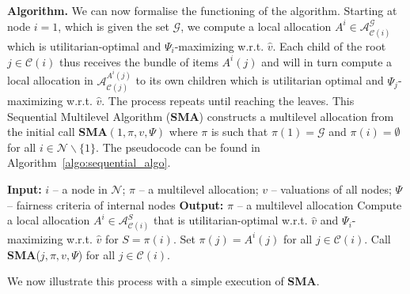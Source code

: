 \documentclass[]{article}
\newcommand{\nodes}{\mathcal{N}}
\newcommand{\items}{\mathcal{G}}
\newcommand{\children}{\mathcal{C}}
\newcommand{\allocations}{\mathcal{A}}
\begin{document}
\medskip

\noindent \textbf{Algorithm.} We can now formalise the functioning of the algorithm. Starting at node $i=1$, which is given the set $\items$, we compute a local allocation $A^i \in \allocations^{\items}_{\children(i)}$ which is utilitarian-optimal and $\Psi_{i}$-maximizing w.r.t. $\hat{v}$. Each child of the root $j \in \children(i)$ thus receives the bundle of items $A^i(j)$ and will in turn compute a local allocation in $\allocations^{A^i(j)}_{\children(j)}$ to its own children which is  utilitarian optimal and $\Psi_j$-maximizing w.r.t. $\hat{v}$. The process repeats until reaching the leaves. This Sequential Multilevel Algorithm (\textbf{SMA}) constructs a multilevel allocation from the initial call \textbf{SMA}$(1, \pi, v, \Psi)$ where $\pi $ is such that $\pi(1) = \items$ and $\pi(i) = \emptyset$ for all $i \in \nodes \backslash \{1\}$. The pseudocode can be found in Algorithm~\ref{algo:sequential_algo}. 

\begin{algorithm}[] \small
\caption{\small Sequential Multilevel Algorithm (SMA)}
\label{algo:sequential_algo}
\begin{algorithmic}[1]
    \State \textbf{Input:} $i$ -- a node in $\nodes$; $\pi $ -- a multilevel allocation; $v$ -- valuations of all nodes; $\Psi$ -- fairness criteria of internal nodes
    \State \textbf{Output:} $\pi $ -- a multilevel allocation
    \If{$\children \neq \emptyset$}
        \State Compute a local allocation $A^i \in \allocations^S_{\children(i)}$ that is utilitarian-optimal w.r.t. $\hat{v}$ and $\Psi_i$-maximizing w.r.t. $\hat{v}$ for $S = \pi(i)$.
        \State Set $\pi(j)=A^i(j)$ for all $j \in \children(i)$.
        \State Call \textbf{SMA}($j, \pi, v, \Psi$) for all $j \in \children(i)$.
    \EndIf
\end{algorithmic}
\end{algorithm}

We now illustrate this process with a simple execution of {\bf SMA}.
\end{document}
